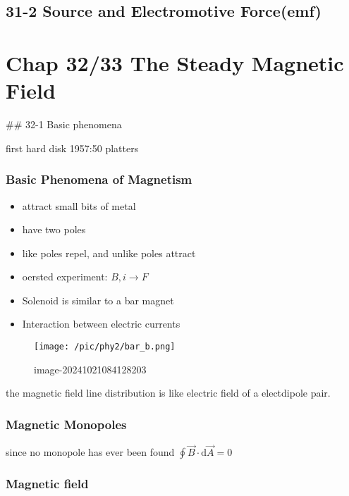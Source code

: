 \documentclass[
]{article}
\providecommand{\tightlist}{%
  \setlength{\itemsep}{0pt}\setlength{\parskip}{0pt}}
\begin{document}
\hypertarget{source-and-electromotive-forceemf}{%
\subsection{31-2 Source and Electromotive
Force(emf)}\label{source-and-electromotive-forceemf}}

\hypertarget{chap-3233-the-steady-magnetic-field}{%
\section{Chap 32/33 The Steady Magnetic
Field}\label{chap-3233-the-steady-magnetic-field}}

\#\# 32-1 Basic phenomena

first hard disk 1957:50 platters

\hypertarget{basic-phenomena-of-magnetism}{%
\subsubsection{Basic Phenomena of
Magnetism}\label{basic-phenomena-of-magnetism}}

\begin{itemize}
\tightlist
\item
  attract small bits of metal
\item
  have two poles
\item
  like poles repel, and unlike poles attract
\item
  oersted experiment: \(B,i\to F\)
\item
  Solenoid is similar to a bar magnet
\item
  Interaction between electric currents
\end{itemize}

\begin{figure}
\centering
\texttt{[image: /pic/phy2/bar\_b.png]}
\caption{image-20241021084128203}
\end{figure}

the magnetic field line distribution is like electric field of a
electdipole pair.

\hypertarget{magnetic-monopoles}{%
\subsubsection{Magnetic Monopoles}\label{magnetic-monopoles}}

since no monopole has ever been found
\(\displaystyle \oint \vec B\cdot \mathrm d \vec A=0\)

\hypertarget{magnetic-field}{%
\subsubsection{Magnetic field}\label{magnetic-field}}
\end{document}
